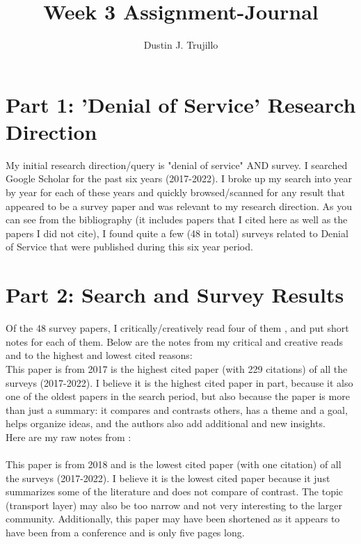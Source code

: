 \documentclass[a4paper]{article}
\date{\displaydate{date}}
\title{Week 3 Assignment-Journal}
\author{Dustin J. Trujillo}
\begin{document}
\maketitle


\section{Part 1: 'Denial of Service' Research Direction}
My initial research direction/query is "denial of service" AND survey. I searched Google Scholar for the past six years (2017-2022). I broke up my search into year by year for each of these years and quickly browsed/scanned for any result that appeared to be a survey paper and was relevant to my research direction. As you can see from the bibliography (it includes papers that I cited here as well as the papers I did not cite), I found quite a few (48 in total) surveys related to Denial of Service that were published during this six year period.

\section{Part 2: Search and Survey Results}
Of the 48 survey papers, I critically/creatively read four of them \cite{mahjabin2017survey, saif2018review, salim2020distributed, rios2022detection}, and put short notes for each of them. Below are the notes  from my critical and creative reads and to the highest and lowest cited reasons: \\

This paper \cite{mahjabin2017survey} is from 2017 is the highest cited paper (with 229 citations) of all the surveys (2017-2022). I believe it is the highest cited paper in part, because it also one of the oldest papers in the search period, but also because the paper is more than just a summary: it compares and contrasts others, has a theme and a goal, helps organize ideas, and the authors also add additional and new insights. \\

Here are my raw notes from \cite{mahjabin2017survey}:\\
 
\\

This paper \cite{saif2018review} is from 2018 and is the lowest cited paper (with one citation) of all the surveys (2017-2022). I believe it is the lowest cited paper because it just summarizes some of the literature and does not compare of contrast. The topic (transport layer) may also be too narrow and not very interesting to the larger community. Additionally, this paper may have been shortened as it appears to have been from a conference and is only five pages long. \\
\end{document}
